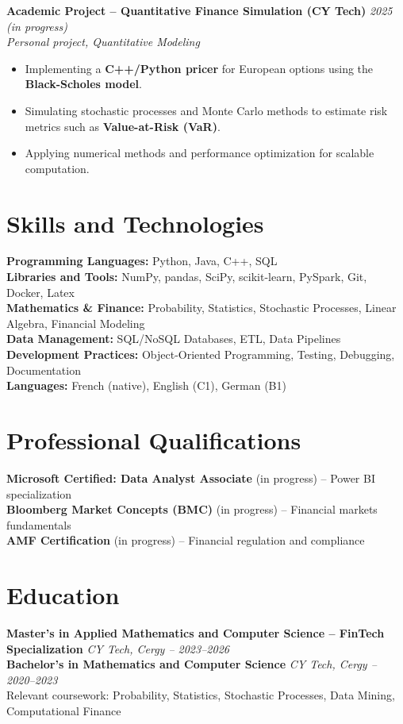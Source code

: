 \documentclass[10pt, letterpaper]{article}
\begin{document}
\vspace{0.2cm}

\textbf{Academic Project – Quantitative Finance Simulation (CY Tech)} \hfill \textit{2025 (in progress)}\\
\textit{Personal project, Quantitative Modeling}
\begin{itemize}
    \item Implementing a \textbf{C++/Python pricer} for European options using the \textbf{Black-Scholes model}.
    \item Simulating stochastic processes and Monte Carlo methods to estimate risk metrics such as \textbf{Value-at-Risk (VaR)}.
    \item Applying numerical methods and performance optimization for scalable computation.
\end{itemize}

\section*{Skills and Technologies}

\textbf{Programming Languages:} Python, Java, C++, SQL\\
\textbf{Libraries and Tools:} NumPy, pandas, SciPy, scikit-learn, PySpark, Git, Docker, Latex\\
\textbf{Mathematics \& Finance:} Probability, Statistics, Stochastic Processes, Linear Algebra, Financial Modeling\\
\textbf{Data Management:} SQL/NoSQL Databases, ETL, Data Pipelines\\
\textbf{Development Practices:} Object-Oriented Programming, Testing, Debugging, Documentation\\
\textbf{Languages:} French (native), English (C1), German (B1)

\section*{Professional Qualifications}

\textbf{Microsoft Certified: Data Analyst Associate} (in progress) – Power BI specialization\\
\textbf{Bloomberg Market Concepts (BMC)} (in progress) – Financial markets fundamentals\\
\textbf{AMF Certification} (in progress) – Financial regulation and compliance

\section*{Education}
\textbf{Master’s in Applied Mathematics and Computer Science – FinTech Specialization} \hfill \textit{CY Tech, Cergy – 2023–2026}\\
\textbf{Bachelor’s in Mathematics and Computer Science} \hfill \textit{CY Tech, Cergy – 2020–2023}\\
Relevant coursework: Probability, Statistics, Stochastic Processes, Data Mining, Computational Finance
\end{document}
